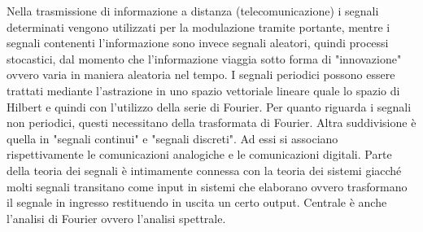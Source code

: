 \documentclass[12pt,oneside,openany]{memoir}
\numberwithin{equation}{subsection}
\begin{document}
Nella trasmissione di informazione a distanza (telecomunicazione) i segnali
determinati vengono utilizzati per la modulazione tramite portante, mentre i
segnali contenenti l'informazione sono invece segnali aleatori, quindi processi
stocastici, dal momento che l'informazione viaggia sotto forma di "innovazione"
ovvero varia in maniera aleatoria nel tempo.
\bigbreak
I segnali periodici possono essere trattati mediante l'astrazione in uno spazio
vettoriale lineare quale lo spazio di Hilbert e quindi con l'utilizzo della
serie di Fourier. Per quanto riguarda i segnali non periodici, questi
necessitano della trasformata di Fourier.
\bigbreak
Altra suddivisione \`e quella in "segnali continui" e "segnali discreti". Ad
essi si associano rispettivamente le comunicazioni analogiche e le comunicazioni
digitali.
\bigbreak
Parte della teoria dei segnali \`e intimamente connessa con la teoria dei
sistemi giacch\'e molti segnali transitano come input in sistemi che elaborano
ovvero trasformano il segnale in ingresso restituendo in uscita un certo output.
Centrale \`e anche l'analisi di Fourier ovvero l'analisi spettrale. 

\end{document}
